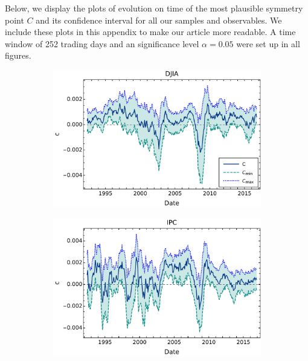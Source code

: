 \documentclass{elsarticle}
\begin{document}
Below, we display the plots of evolution on time of the most plausible symmetry point $C$ and its confidence interval for all our samples and observables. We include these plots in this appendix to make our article more readable. A time window of 252 trading days and an significance level $\alpha=0.05$ were set up in all figures.

\begin{figure}[h!tb]
        \centering
        \begin{subfigure}[b]{0.44\textwidth}
            \centering
            \includegraphics[width=\textwidth]{figures/SimmReturns/Simetria_DJIA_CL005.pdf}
            \label{fig:SymmReturns005DJIA}
        \end{subfigure}
        \quad
        \begin{subfigure}[b]{0.44\textwidth}
            \centering 
            \includegraphics[width=\textwidth]{figures/SimmReturns/Simetria_IPC_CL005.pdf}

\end{subfigure}
\end{figure}
\end{document}
